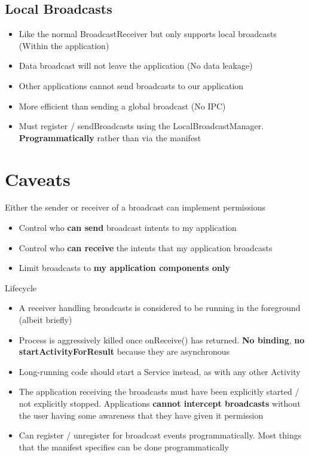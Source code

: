 \documentclass{article}
\begin{document}
\subsection{Local Broadcasts}

\begin{itemize}
  \item Like the normal BroadcastReceiver but only supports local broadcasts (Within the application) 
  \item Data broadcast will not leave the application (No data leakage)
  \item Other applications cannot send broadcasts to our application 
  \item More efficient than sending a global broadcast (No IPC)
  \item Must register / sendBroadcasts using the LocalBroadcastManager. \textbf{Programmatically} rather than via the manifest
\end{itemize}

\section{Caveats}

\begin{flushleft}
Either the sender or receiver of a broadcast can implement permissions
\begin{itemize}
  \item Control who \textbf{can send} broadcast intents to my application 
  \item Control who \textbf{can receive} the intents that my application broadcasts 
  \item Limit broadcasts to \textbf{my application components only}
\end{itemize}
Lifecycle
\begin{itemize}
  \item A receiver handling broadcasts is considered to be running in the foreground (albeit briefly) 
  \item Process is aggressively killed once onReceive() has returned. \textbf{No binding}, \textbf{no startActivityForResult} because they are asynchronous
  \item Long-running code should start a Service instead, as with any other Activity
\end{itemize}
\begin{itemize}
  \item The application receiving the broadcasts must have been explicitly started / not explicitly stopped. Applications \textbf{cannot intercept broadcasts} without the user having some awareness that they have given it permission 
  \item Can register / unregister for broadcast events programmatically. Most things that the manifest specifies can be done programmatically
\end{itemize}
\end{flushleft}
\end{document}

